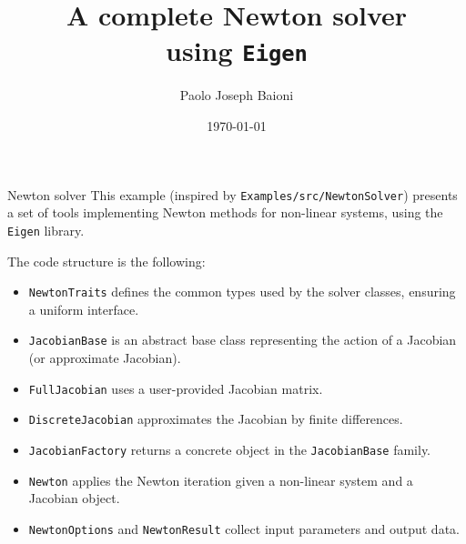 \documentclass[10pt]{beamer}
\begin{document}
    \title{A complete Newton solver\protect\\ using \texttt{Eigen}}
    \author{Paolo Joseph Baioni}
    \date{\today}

\begin{frame}
    \maketitle
\end{frame}

\begin{frame}{Newton solver}
	This example (inspired by \texttt{Examples/src/NewtonSolver}) presents a set of tools implementing Newton methods for non-linear systems, using the \texttt{Eigen} library.
	
	The code structure is the following:
	\begin{itemize}\small
		\item \texttt{NewtonTraits} defines the common types used by the solver classes, ensuring a uniform interface.
		\item \texttt{JacobianBase} is an abstract base class representing the action of a Jacobian (or approximate Jacobian).
		\item \texttt{FullJacobian} uses a user-provided Jacobian matrix.
		\item \texttt{DiscreteJacobian} approximates the Jacobian by finite differences.
		\item \texttt{JacobianFactory} returns a concrete object in the \texttt{JacobianBase} family.
		\item \texttt{Newton} applies the Newton iteration given a non-linear system and a Jacobian object.
		\item \texttt{NewtonOptions} and \texttt{NewtonResult} collect input parameters and output data.
	\end{itemize}
\end{frame}
\end{document}
